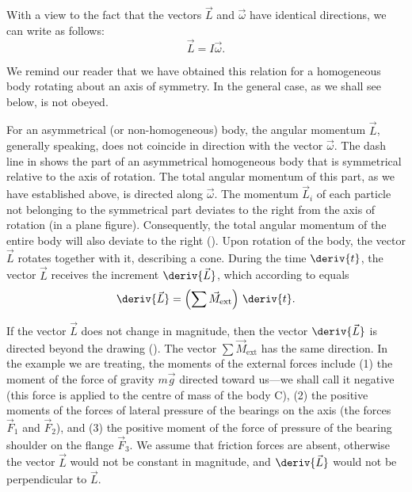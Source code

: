 With a view to the fact that the vectors $\vec{L}$ and $\vec{\omega}$ have identical directions, we can write  as follows:
\begin{equation}\label{eq:5_12}
\vec{L} = I \vec{\omega}.
\end{equation}

\noindent
We remind our reader that we have obtained this relation for a homogeneous body rotating about an axis of symmetry. In the general case, as we shall see below,  is not obeyed.

For an asymmetrical (or non-homogeneous) body, the angular momentum $\vec{L}$, generally speaking, does not coincide in direction with the vector $\vec{\omega}$. The dash line in  shows the part of an asymmetrical homogeneous body that is symmetrical relative to the axis of rotation. The total angular momentum of this part, as we have established above, is directed along $\vec{\omega}$. The momentum $\vec{L}_i$ of each particle not belonging to the symmetrical part deviates to the right from the axis of rotation (in a plane figure). Consequently, the total angular momentum of the entire body will also deviate to the right (). Upon rotation of the body, the vector $\vec{L}$ rotates together with it, describing a cone. During the time $\deriv{t}$, the vector $\vec{L}$ receives the increment $\deriv{\vec{L}}$, which according to  equals
\begin{equation}\label{eq:5_13}
\deriv{\vec{L}} = \left( \sum \vec{M}_{\text{ext}} \right) \, \deriv{t}.
\end{equation}

\noindent
If the vector $\vec{L}$ does not change in magnitude, then the vector $\deriv{\vec{L}}$ is directed beyond the drawing (). The vector $\sum\vec{M}_{\text{ext}}$ has the same direction. In the example we are treating, the moments of the external forces include (1) the moment of the force of gravity $m\vec{g}$ directed toward us---we shall call it negative (this force is applied to the centre of mass of the body C), (2) the positive moments of the forces of lateral pressure of the bearings on the axis (the forces $\vec{F}_1$ and $\vec{F}_2$), and (3) the positive moment of the force of pressure of the bearing shoulder on the flange $\vec{F}_3$. We assume that friction forces are absent, otherwise the vector $\vec{L}$ would not be constant in magnitude, and $\deriv{\vec{L}}$ would not be perpendicular to $\vec{L}$.

